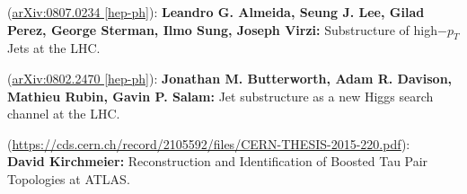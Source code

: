 \begin{thebibliography}{1}
        (\href{https://arxiv.org/abs/0807.0234}{arXiv:0807.0234 [hep-ph]}):
        {\bf Leandro G. Almeida, Seung J. Lee, Gilad Perez, George Sterman, Ilmo Sung, Joseph Virzi:}
        Substructure of high$-p_T$ Jets at the LHC.
        
        (\href{https://arxiv.org/abs/0802.2470}{arXiv:0802.2470 [hep-ph]}):
        {\bf Jonathan M. Butterworth, Adam R. Davison, Mathieu Rubin, Gavin P. Salam:}
        Jet substructure as a new Higgs search channel at the LHC.

        (\url{https://cds.cern.ch/record/2105592/files/CERN-THESIS-2015-220.pdf}):\\
        {\bf David Kirchmeier:}
        Reconstruction and Identification of Boosted Tau Pair Topologies at ATLAS.

\end{thebibliography}